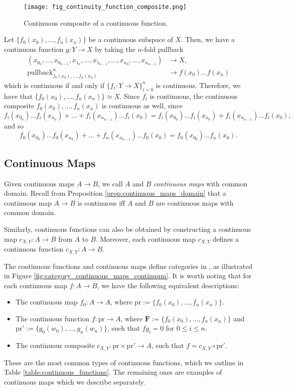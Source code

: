 \documentclass[a4paper,reqno,oneside]{article}
\begin{document}
\begin{figure}[ht]
\centering
\texttt{[image: fig\_continuity\_function\_composite.png]}
\caption{Continuous composite of a continuous function.}
\label{fig:continuous_function_composite}
\end{figure}

Let $\{f_0(x_0),...,f_n(x_n)\}$ be a continuous subspace of $X$. Then, we have a continuous function $g: Y \to X$ by taking the $n$-fold pullback
\begin{align*}
(x_0_0,...,x_0_{n-1},x_1_0,...,x_1_{n-1},...,x_n_0,...,x_n_{n-1}) & \longrightarrow X, \\
\mathrm{pullback}^n_{f_0(x_0),...,f_n(x_n)} & \longrightarrow f(x_0)... f(x_n)
\end{align*}
which is continuous if and only if $\{f_i: Y \to X\}_{i = 0}^n$ is continuous. Therefore, we have that $\{f_0(x_0),...,f_n(x_n)\} \simeq X$. Since $f_i$ is continuous, the continuous composite $f_0(x_0),...,f_n(x_n)$ is continuous as well, since
$$
f_i(x_0_0)... f_i(x_n_0) +... + f_i(x_n_{n-1})... f_i(x_0) = f_i(x_0_0)... f_i(x_n_0) + f_i(x_n_{n-1})... f_i(x_0),
$$
and so
$$
f_0(x_0_0)... f_0(x_n_0) +... + f_n(x_n_{n-1})... f_0(x_0) = f_0(x_0_0)... f_n(x_0).
$$

\subsection*{Continuous Maps}
Given continuous maps $A \to B$, we call $A$ and $B$ \textit{continuous maps} with common domain. Recall from Proposition \ref{prop:continuous_maps_domain} that a continuous map $A \to B$ is continuous iff $A$ and $B$ are continuous maps with common domain.

Similarly, continuous functions can also be obtained by constructing a continuous map $c_{X,Y} : A \to B$ from $A$ to $B$. Moreover, each continuous map $c_{X,Y}$ defines a continuous function $c_{X,Y} : A \to B$.

The continuous functions and continuous maps define categories in \cite{Moser1986}, as illustrated in Figure \ref{fig:category_continuous_maps_continuum}. It is worth noting that for each continuous map $f : A \to B$, we have the following equivalent descriptions:
\begin{itemize}
    \item The continuous map $f_0 : A \to A$, where $\mathrm{pr} := \{f_0(x_0),...,f_n(x_n)\}$.
    \item The continuous function $f : \mathrm{pr} \to A$, where $\mathbf{F} := \{f_0(x_0),...,f_n(x_n)\}$ and $\mathrm{pr'} := \{g_0(w_0),...,g_n(w_n)\}$, such that $fg_i = 0$ for $0 \le i \le n$.
    \item The continuous composite $c_{X,Y} : \mathrm{pr} \times \mathrm{pr'} \to A$, such that $f = c_{X,Y} \circ \mathrm{pr'}$.
\end{itemize}
These are the most common types of continuous functions, which we outline in Table \ref{table:continuous_functions}. The remaining ones are examples of continuous maps which we describe separately. 
\end{document}
